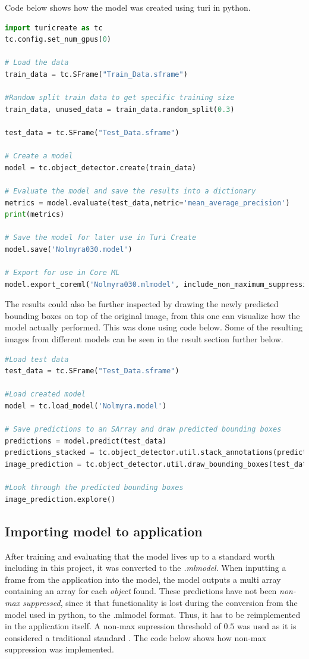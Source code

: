 Code below shows how the model was created using turi in python.
\begin{lstlisting}[language=python]
import turicreate as tc
tc.config.set_num_gpus(0)

# Load the data
train_data = tc.SFrame("Train_Data.sframe")

#Random split train data to get specific training size
train_data, unused_data = train_data.random_split(0.3)

test_data = tc.SFrame("Test_Data.sframe")

# Create a model
model = tc.object_detector.create(train_data)

# Evaluate the model and save the results into a dictionary
metrics = model.evaluate(test_data,metric='mean_average_precision')
print(metrics)

# Save the model for later use in Turi Create
model.save('Nolmyra030.model')

# Export for use in Core ML
model.export_coreml('Nolmyra030.mlmodel', include_non_maximum_suppression=False)
\end{lstlisting}
The results could also be further inspected by drawing the newly predicted bounding boxes on top of the original image, from this one can visualize how the model actually performed. This was done using code below. Some of the resulting images from different models can be seen in the result section further below. 

\begin{lstlisting}[language=python]
#Load test data
test_data = tc.SFrame("Test_Data.sframe")

#Load created model
model = tc.load_model('Nolmyra.model')

# Save predictions to an SArray and draw predicted bounding boxes
predictions = model.predict(test_data)
predictions_stacked = tc.object_detector.util.stack_annotations(predictions)
image_prediction = tc.object_detector.util.draw_bounding_boxes(test_data['image'], predictions)

#Look through the predicted bounding boxes
image_prediction.explore()
\end{lstlisting}

\subsection{Importing model to application}

After training and evaluating that the model lives up to a standard worth including in this
 project, it was converted to the \textit{.mlmodel}. When inputting a frame from the
application into the model, the model outputs a multi array containing an array for each
  \textit{object} found. These predictions have not been \textit{non-max suppressed}, since it that functionality is lost during the conversion from the model used in python, to the .mlmodel format. Thus, it has to be reimplemented in the application itself. 
  A non-max supression threshold of $0.5$ was used as it is considered a traditional standard \cite{nms}. The code below shows how non-max suppression was implemented. 

